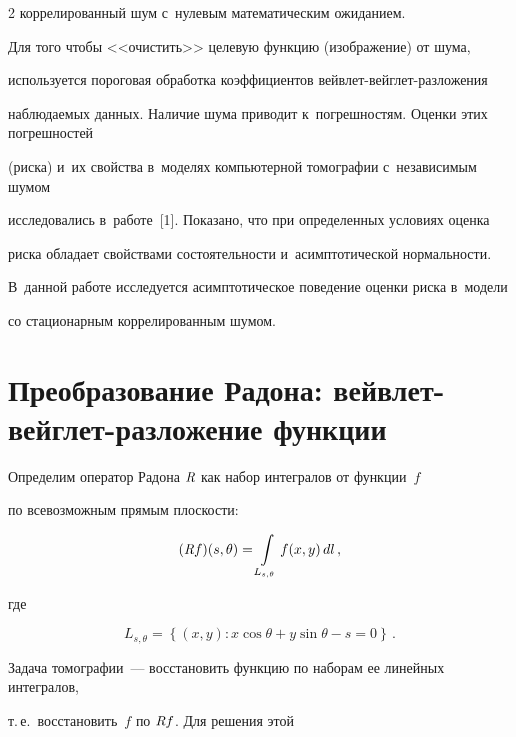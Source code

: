 \begin{multicols}{2}
коррелированный шум с~нулевым математическим ожиданием.





Для того чтобы <<очистить>> целевую функцию (изображение) от шума,


используется пороговая обработка коэффициентов вейв\-лет-вейг\-лет-раз\-ло\-же\-ния


наблюдаемых данных. Наличие шума приводит к~погрешностям. Оценки этих погрешностей


(риска) и~их свойства в~моделях компьютерной томографии с~независимым шумом


исследовались в~работе~[1]. Показано, что при определенных условиях оценка


риска обладает свойствами состоятельности и~асимптотической нормальности.


В~данной работе исследуется асимптотическое поведение оценки риска в~модели


со стационарным коррелированным шумом.





\section{Преобразование Радона: вейвлет-вейглет-разложение функции}





Определим оператор Радона $\textit{R}$ как набор интегралов от функции~$f$


по всевозможным прямым плос\-кости:


\begin{equation*}


(\Radon f)(s,\theta) = \int\limits_{L_{s,\theta}} f(x,y)\, d l\,,


\end{equation*}


где


\begin{equation*}


{L_{s,\theta}} = \left\{(x,y)\colon x\cos\theta + y\sin\theta - s = 0 \right\}\,.


\end{equation*}





Задача томографии~--- восстановить функцию по наборам ее линейных интегралов,


 т.\,е.\ восстановить~$f$ по $\textit{R} f$. Для решения этой



\end{multicols}
